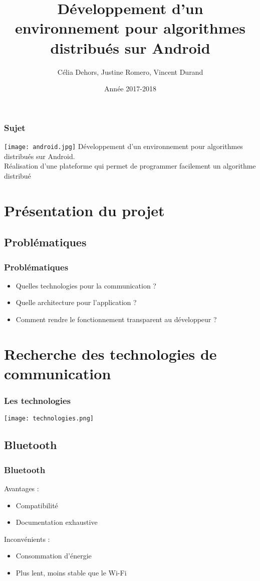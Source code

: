 \documentclass{beamer}
\title{Développement d’un environnement pour algorithmes distribués sur Android}
\author{Célia Dehors, Justine Romero, Vincent Durand}
\institute{Université de Franche-Comté}
\date{Année 2017-2018}
\begin{document}
    \begin{frame}[plain]
        \titlepage
    \end{frame}
	\begin{frame}
	  \frametitle{Sujet}
	  \texttt{[image: android.jpg]}
	  Développement d’un environnement pour algorithmes distribués sur Android.
	  \\Réalisation d’une plateforme qui permet de programmer facilement un algorithme distribué
        \end{frame}
    \begin{frame}
        \tableofcontents
    \end{frame}
    \section{Présentation du projet}
      \subsection{Problématiques}
        \begin{frame}
	  \frametitle{Problématiques}
	  \begin{itemize}
	   \item Quelles technologies pour la communication ?
	   \item Quelle architecture pour l'application ?
	   \item Comment rendre le fonctionnement transparent au développeur ?
	  \end{itemize}

        \end{frame}
    
    \section{Recherche des technologies de communication}
      \begin{frame}
	\frametitle{Les technologies}
	\texttt{[image: technologies.png]}
      \end{frame}
      \subsection{Bluetooth}
      \begin{frame}
	  \frametitle{Bluetooth}
	  \begin{block}{Avantages :}
	  \begin{itemize}
	   \item Compatibilité
	   \item Documentation exhaustive
	  \end{itemize}
	  \end{block}
	  \begin{block}{Inconvénients :}
	  \begin{itemize}
	   \item Consommation d'énergie
	   \item Plus lent, moins stable que le Wi-Fi
	  \end{itemize}
	  \end{block}
      \end{frame}
\end{document}
